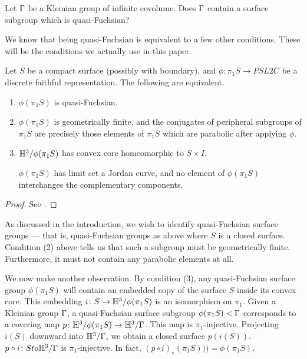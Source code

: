 \begin{prob}

Let $\Gamma$ be a Kleinian group of infinite covolume. Does $\Gamma$ contain
a surface subgroup which is quasi-Fuchsian?

\end{prob}

We know that being quasi-Fuchsian is equivalent to a few other conditions.
These will be the conditions we actually use in this paper.

\begin{prop}

Let $S$ be a compact surface (possibly with boundary), and $\phi \colon \pi_1S
\to PSL2C$ be a discrete faithful representation. The following are equivalent.

\begin{enumerate}

\item $\phi(\pi_1S)$ is quasi-Fuchsian.

\item $\phi(\pi_1S)$ is geometrically finite, and the conjugates of peripheral
subgroups of $\pi_1S$ are precisely those elements of $\pi_1S$ which are
parabolic after applying $\phi$.

\item $\mathbb{H}^3/\phi(\pi_1S)$ has convex core homeomorphic to $S \times I$.

$\phi(\pi_1S)$ has limit set a Jordan curve, and no element of $\phi(\pi_1S)$
interchanges the complementary components.

\end{enumerate}

\end{prop}

\begin{proof}

See \cite{Mo}.%

\end{proof}

As discussed in the introduction, we wish to identify quasi-Fuchsian surface
groups --- that is, quasi-Fuchsian groups as above where $S$ is a closed
surface.  Condition (2) above tells us that such a subgroup must be
geometrically finite.  Furthermore, it must not contain any parabolic elements
at all.

We now make another observation. By condition (3), any quasi-Fuchsian surface
group $\phi(\pi_1S)$ will contain an embedded copy of the surface $S$ inside
its convex core.  This embedding $i \colon S \to \mathbb{H}^3/\phi(\pi_1S)$ is an
isomorphism on $\pi_1$.  Given a Kleinian group $\Gamma$, a quasi-Fuchsian surface
subgroup $\phi(\pi_1S) < \Gamma$ corresponds to a covering map $p \colon
\mathbb{H}^3/\phi(\pi_1S) \to \mathbb{H}^3/\Gamma$. This map is $\pi_1$-injective.  Projecting
$i(S)$ downward into $\mathbb{H}^3/\Gamma$, we obtain a closed surface $p(i(S))$. $p
\circ i \colon S to \mathbb{H}^3/\Gamma$ is $\pi_1$-injective. In fact, $(p \circ
i)_\star(\pi_1S))) = \phi(\pi_1S)$.

